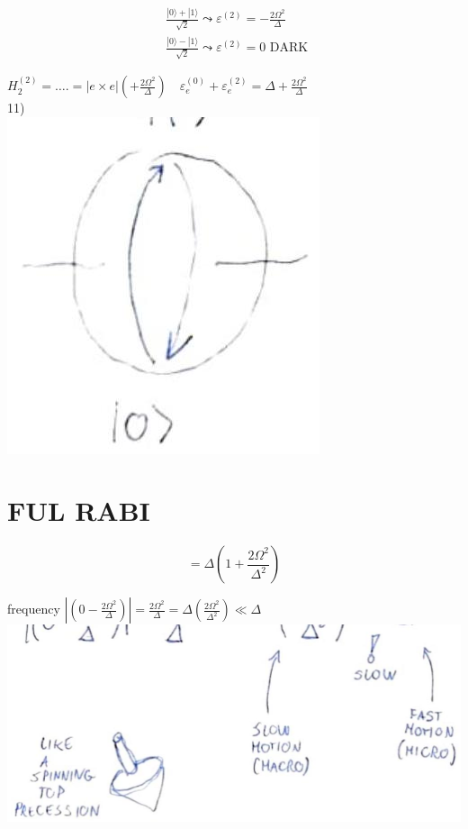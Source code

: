 \documentclass[10pt]{article}
\begin{document}
$$
\begin{aligned}
& \frac{|0\rangle+|1\rangle}{\sqrt{2}} \leadsto \varepsilon^{(2)}=-\frac{2 \Omega^{2}}{\Delta} \\
& \frac{|0\rangle-|1\rangle}{\sqrt{2}} \leadsto \varepsilon^{(2)}=0 \text { DARK }
\end{aligned}
$$

$H_{2}^{(2)}=\ldots .=|e \times e|\left(+\frac{2 \Omega^{2}}{\Delta}\right) \quad \varepsilon_{e}^{(0)}+\varepsilon_{e}^{(2)}=\Delta+\frac{2 \Omega^{2}}{\Delta}$\\
11)\\
\includegraphics[max width=\textwidth, center]{2025_10_16_f6b2ddb567eefef2c7a2g-4(1)}

\section*{FUL RABI}
$$
=\Delta\left(1+\frac{2 \Omega^{2}}{\Delta^{2}}\right)
$$

frequency $\left|\left(0-\frac{2 \Omega^{2}}{\Delta}\right)\right|=\frac{2 \Omega^{2}}{\Delta}=\Delta\left(\frac{2 \Omega^{2}}{\Delta^{2}}\right) \ll \Delta$\\
\includegraphics[max width=\textwidth, center]{2025_10_16_f6b2ddb567eefef2c7a2g-4(2)}
\end{document}
